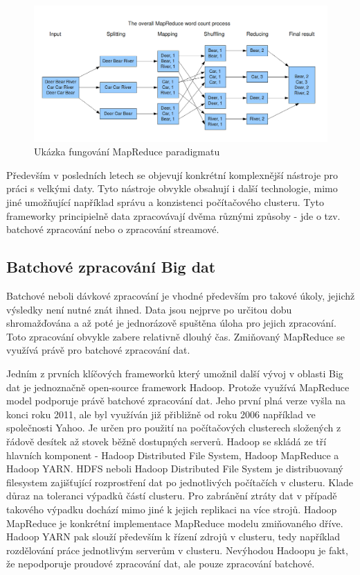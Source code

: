 \documentclass[thesis=B,czech]{FITthesis}[2012/06/26]
\begin{document}
	\begin{figure}[ht]
    	\centering
    	\includegraphics[width=1\textwidth]{images/mapreduce.png}
    	\caption{Ukázka fungování MapReduce paradigmatu \cite{mapreduce-img} }
    	\label{fig:mapreduce}
	\end{figure}
	
	Především v posledních letech se objevují konkrétní komplexnější nástroje pro práci s velkými daty. Tyto nástroje obvykle obsahují i další technologie, mimo jiné umožňující například správu a konzistenci počítačového clusteru. Tyto frameworky principielně data zpracovávají dvěma různými způsoby - jde o tzv. batchové zpracování nebo o zpracování streamové. 
	
\subsection{Batchové zpracování Big dat}
	Batchové neboli dávkové zpracování je vhodné především pro takové úkoly, jejichž výsledky není nutné znát ihned. Data jsou nejprve po určitou dobu shromažďována a až poté je jednorázově spuštěna úloha pro jejich zpracování. Toto zpracování obvykle zabere relativně dlouhý čas. Zmiňovaný MapReduce se využívá právě pro batchové zpracování dat. 

	Jedním z prvních klíčových frameworků který umožnil další vývoj v oblasti Big dat je jednoznačně open-source framework Hadoop\cite{hadoop-home}. Protože využívá MapReduce model podporuje právě batchové zpracování dat. Jeho první plná verze vyšla na konci roku 2011, ale byl využíván již přibližně od roku 2006 například ve společnosti Yahoo\cite{hadoop-history}. Je určen pro použití na počítačových clusterech složených z řádově desítek až stovek běžně dostupných serverů. Hadoop se skládá ze tří hlavních komponent - Hadoop Distributed File System, Hadoop MapReduce a Hadoop YARN. HDFS neboli Hadoop Distributed File System je distribuovaný filesystem zajišťující rozprostření dat po jednotlivých počítačích v clusteru. Klade důraz na toleranci výpadků částí clusteru. Pro zabránění ztráty dat v případě takového výpadku dochází mimo jiné k jejich replikaci na více strojů. Hadoop MapReduce je konkrétní implementace MapReduce modelu zmiňovaného dříve. Hadoop YARN pak slouží především k řízení zdrojů v clusteru, tedy například rozdělování práce jednotlivým serverům v clusteru. Nevýhodou Hadoopu je fakt, že nepodporuje proudové zpracování dat, ale pouze zpracování batchové. 
	
\end{document}
